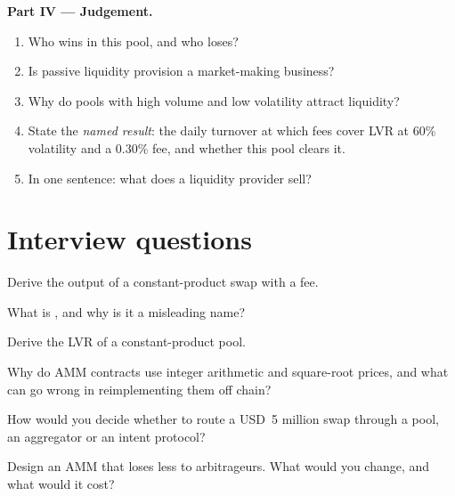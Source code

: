 \begin{problem}
\medskip\noindent\textbf{Part IV --- Judgement.}
\begin{enumerate}[resume]
\item Who wins in this pool, and who loses?
\item Is passive liquidity provision a market-making business?
\item Why do pools with high volume and low volatility attract liquidity?
\item State the \emph{named result}: the daily turnover at which fees cover LVR at 60\% volatility and a 0.30\% fee, and whether this pool clears it.
\item In one sentence: what does a liquidity provider sell?
\end{enumerate}
\end{problem}

\section{Interview questions}

\begin{interviewq}\label{iq:m3:automated-market-makers:1}
Derive the output of a constant-product swap with a fee.
\end{interviewq}

\begin{interviewq}\label{iq:m3:automated-market-makers:2}
What is , and why is it a misleading name?
\end{interviewq}

\begin{interviewq}\label{iq:m3:automated-market-makers:3}
Derive the LVR of a constant-product pool.
\end{interviewq}

\begin{interviewq}\label{iq:m3:automated-market-makers:4}
Why do AMM contracts use integer arithmetic and square-root prices, and what can go wrong in reimplementing them off chain?
\end{interviewq}

\begin{interviewq}\label{iq:m3:automated-market-makers:5}
How would you decide whether to route a USD~5 million swap through a pool, an aggregator or an intent protocol?
\end{interviewq}

\begin{interviewq}\label{iq:m3:automated-market-makers:6}
Design an AMM that loses less to arbitrageurs. What would you change, and what would it cost?
\end{interviewq}

